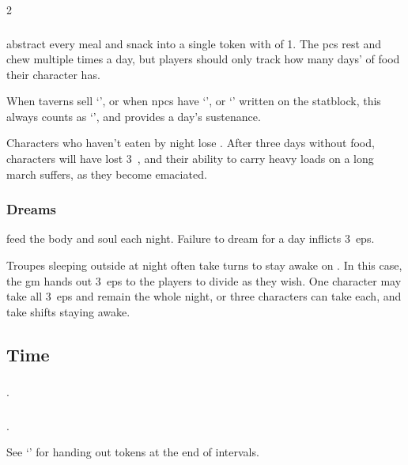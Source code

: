 \begin{multicols}{2}
\subsubsection{}
\label{hunger}
abstract every meal and snack into a single token with  of 1.
The \glspl{pc} rest and chew multiple times a day, but players should only track how many days' of food their character has.

When taverns sell `\rations', or when \glspl{npc} have `\rations', or `\rations' written on the \gls{statblock}, this always counts as `', and provides a day's sustenance.

Characters who haven't eaten by night lose .
After three days without food, characters will have lost 3~, and their ability to carry heavy loads on a long march suffers, as they become emaciated.

\subsubsection{Dreams}
feed the body and soul each night.
Failure to dream for a day inflicts 3~\glspl{ep}.

Troupes sleeping outside at night often take turns to stay awake on .
In this case, the \gls{gm} hands out 3~\glspl{ep} to the players to divide as they wish.
One character may take all 3~\glspl{ep} and remain the whole night, or three characters can take  each, and take shifts staying awake.

\subsection{Time}
\label{time}

\subsubsection{}
.

\subsubsection{}
.

See `'  for handing out tokens at the end of \glspl{interval}.


\end{multicols}
